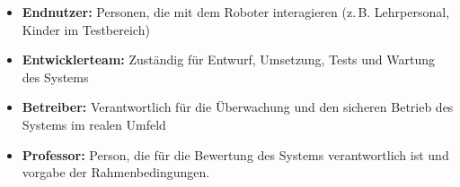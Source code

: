 \begin{itemize}
    \item \textbf{Endnutzer:} Personen, die mit dem Roboter interagieren (z. B. Lehrpersonal, Kinder im Testbereich)
    \item \textbf{Entwicklerteam:} Zuständig für Entwurf, Umsetzung, Tests und Wartung des Systems
    \item \textbf{Betreiber:} Verantwortlich für die Überwachung und den sicheren Betrieb des Systems im realen Umfeld
    \item \textbf{Professor:} Person, die für die Bewertung des Systems verantwortlich ist und vorgabe der Rahmenbedingungen.

\end{itemize}
